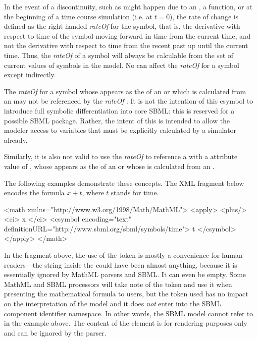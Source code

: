 \begin{itemize}
\begin{blockChanged}
  In the event of a discontinuity, such as might happen due to an \Event, a  function, or at the beginning of a time course simulation (i.e. at $t=0$), the rate of change is defined as the right-handed \emph{rateOf} for the symbol, that is, the derivative with respect to time of the symbol moving forward in time from the current time, and not the derivative with respect to time from the recent past up until the current time.  Thus, the \emph{rateOf} of a symbol will always be calculable from the set of current values of symbols in the model.  No \Event can affect the \emph{rateOf} for a symbol except indirectly.

The \emph{rateOf} for a symbol whose  appears as the  of an \AssignmentRule or which is calculated from an \AlgebraicRule may not be referenced by the \emph{rateOf} .  It is not the intention of this csymbol to introduce full symbolic differentiation into core SBML:  this is reserved for a possible SBML package.  Rather, the intent of this  is intended to allow the modeler access to variables that must be explicitly calculated by a simulator already.

Similarly, it is also not valid to use the \emph{rateOf}  to reference a \Species with a  attribute value of , whose  appears as the  of an \AssignmentRule or whose  is calculated from an \AlgebraicRule.


\end{blockChanged}

\end{itemize}

The following examples demonstrate these concepts.  The XML fragment below
encodes the formula $x + t$, where $t$ stands for time.

\begin{example}
<math xmlns="http://www.w3.org/1998/Math/MathML">
    <apply>
        <plus/>
        <ci> x </ci>
        <csymbol encoding="text" definitionURL="http://www.sbml.org/sbml/symbols/time">
            t
        </csymbol>
    </apply>
</math>
\end{example}


In the fragment above, the use of the token  is mostly a
convenience for human readers---the string inside the
 could have been almost anything, because it is
essentially ignored by MathML parsers and SBML.  It can
  even be empty.  Some MathML and SBML processors will take note
of the token and use it when presenting the mathematical formula
to users, but the token used has no impact on the interpretation
of the model and it does \emph{not} enter into the SBML component
identifier namespace.  In other words, the SBML model cannot refer
to  in the example above.  The content of the
 element is for rendering purposes only and can be
ignored by the parser.

